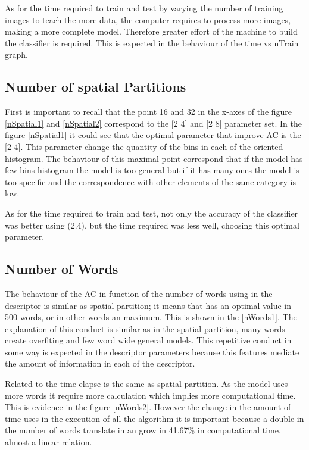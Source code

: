 \documentclass[10pt,twocolumn,letterpaper]{article}
\begin{document}
As for the time required to train and test by varying the number of training images to teach the more data, the computer requires to process more images, making a more complete model. Therefore greater effort of the machine to build the classifier is required. This is expected in the behaviour of the time vs nTrain graph.

\subsection{Number of spatial Partitions}

First is important to recall that the point 16 and 32 in the x-axes of the figure \ref{nSpatial1} and \ref{nSpatial2} correspond to the [2 4] and [2 8] parameter set. In the figure \ref{nSpatial1} it could see that the optimal parameter that improve AC is the [2 4]. This parameter change the quantity of the bins in each of the oriented histogram. The behaviour of this maximal point correspond that if the model has few bins histogram the model is too general but if it has many ones the model is too specific and the correspondence with other elements of the same category is low. 

As for the time required to train and test, not only the accuracy of the classifier was better using (2.4), but the time required was less well, choosing this optimal parameter.

\subsection{Number of Words}

The behaviour of the AC in function of the number of words using in the descriptor is similar as spatial partition; it means that has an optimal value in 500 words, or in other words an maximum. This is shown in the \ref{nWords1}. The explanation of this conduct is similar as in the spatial partition, many words create overfiting and few word wide general models. This repetitive conduct in some way is expected in the descriptor parameters because this features mediate the amount of information in each of the descriptor.

Related to the time elapse is the same as spatial partition. As the model uses more words it require more calculation which implies more computational time. This is evidence in the figure \ref{nWords2}. However the change in the amount of time uses
in the execution of all the algorithm it is important  because a double in the number of words translate in an grow in 41.67\% in computational time, almost a linear relation.
\end{document}
